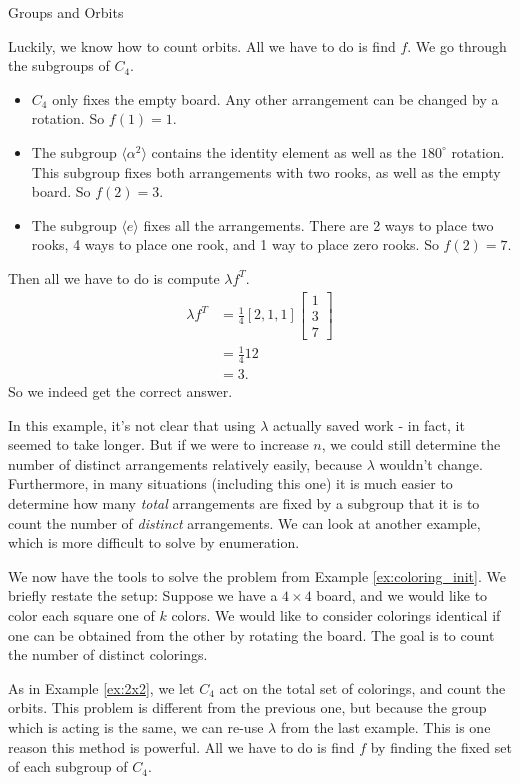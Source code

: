\documentclass[12pt]{pom_thesis}
\begin{document}
\begin{chapter}{Groups and Orbits}
\begin{examp}
Luckily, we know how to count orbits. All we have to do is find $f$. We go through the subgroups of $C_4$.
\begin{itemize}
\item $C_4$ only fixes the empty board. Any other arrangement can be changed by a rotation. So $f(1) = 1$.
\item The subgroup $\langle \alpha^2 \rangle$ contains the identity element as well as the $180^\circ$ rotation. This subgroup fixes both arrangements with two rooks, as well as the empty board. So $f(2) = 3$.
\item The subgroup $\langle e \rangle$ fixes all the arrangements. There are 2 ways to place two rooks, 4 ways to place one rook, and 1 way to place zero rooks. So $f(2) = 7$.
\end{itemize}
Then all we have to do is compute $\lambda f^T$.
\begin{align*}
\lambda f^T &= \frac 14 [2, 1, 1] \begin{bmatrix} 1 \\ 3 \\ 7\end{bmatrix} \\
&= \frac 14 12\\
&=3.
\end{align*}
So we indeed get the correct answer. 
\end{examp}

In this example, it's not clear that using $\lambda$ actually saved work - in fact, it seemed to take longer. But if we were to increase $n$, we could still determine the number of distinct arrangements relatively easily, because $\lambda$ wouldn't change. Furthermore, in many situations (including this one) it is much easier to determine how many \emph{total} arrangements are fixed by a subgroup that it is to count the number of \emph{distinct} arrangements. We can look at another example, which is more difficult to solve by enumeration. 
\begin{examp}\label{ex:coloring}
We now have the tools to solve the problem from Example \ref{ex:coloring_init}. We briefly restate the setup: Suppose we have a $4 \times 4$ board, and we would like to color each square one of $k$ colors. We would like to consider colorings identical if one can be obtained from the other by rotating the board. The goal is to count the number of distinct colorings.

As in Example \ref{ex:2x2}, we let $C_4$ act on the total set of colorings, and count the orbits. This problem is different from the previous one, but because the group which is acting is the same, we can re-use $\lambda$ from the last example. This is one reason this method is powerful. All we have to do is find $f$ by finding the fixed set of each subgroup of $C_4$.


\end{examp}
\end{chapter}
\end{document}
